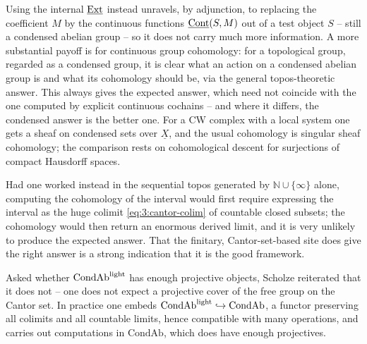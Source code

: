 \begin{remark}
\label{rmk:3:internal-and-group}
Using the internal $\underline{\operatorname{Ext}}$ instead unravels, by adjunction, to
replacing the coefficient $M$ by the continuous functions
$\underline{\operatorname{Cont}}(S,M)$ out of a test object $S$ -- still a condensed abelian
group -- so it does not carry much more information. A more
substantial payoff is for continuous group cohomology: for a topological group,
regarded as a condensed group, it is clear what an action on a condensed abelian
group is and what its cohomology should be, via the general topos-theoretic
answer. This always gives the expected answer, which need not coincide with the
one computed by explicit continuous cochains -- and where it differs, the
condensed answer is the better one. For a CW complex with a local system one gets
a sheaf on condensed sets over $\underline{X}$, and the usual cohomology is
singular sheaf cohomology; the comparison rests on cohomological descent for
surjections of compact Hausdorff spaces.
\end{remark}

\begin{remark}
\label{rmk:3:sequential-topos-bad}
Had one worked instead in the sequential topos generated by
$\mathbb{N}\cup\{\infty\}$ alone, computing the cohomology of the interval would
first require expressing the interval as the huge colimit
\eqref{eq:3:cantor-colim} of countable closed subsets; the cohomology would then
return an enormous derived limit, and it is very unlikely to produce the expected
answer. That the finitary, Cantor-set-based site does give the right answer is a
strong indication that it is the good framework.
\end{remark}

\begin{remark}
\label{rmk:3:enough-projectives-closing}
Asked whether $\mathrm{CondAb}^{\mathrm{light}}$ has enough projective objects, Scholze reiterated that
it does not -- one does not expect a projective cover of the free group on the
Cantor set. In practice one embeds $\mathrm{CondAb}^{\mathrm{light}}\hookrightarrow\mathrm{CondAb}$, a
functor preserving all colimits and all countable limits, hence compatible with
many operations, and carries out computations in $\mathrm{CondAb}$, which does
have enough projectives.
\end{remark}
